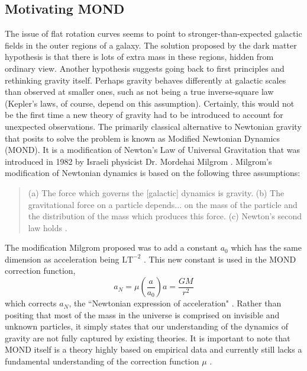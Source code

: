 \documentclass[11pt, twocolumn]{article}
\newcommand{\ff}[2]{\frac{#1}{#2}}
\begin{document}
    \subsection*{Motivating MOND}
    The issue of flat rotation curves seems to point to stronger-than-expected galactic fields in the outer regions of a galaxy. The solution proposed by the dark matter hypothesis is that there is lots of extra mass in these regions, hidden from ordinary view. Another hypothesis suggests going back to first principles and rethinking gravity itself. Perhaps gravity behaves differently at galactic scales than observed at smaller ones, such as not being a true inverse-square law (Kepler's laws, of course, depend on this assumption). Certainly, this would not be the first time a new theory of gravity had to be introduced to account for unexpected observations. The primarily classical alternative to Newtonian gravity that posits to solve the problem is known as Modified Newtonian Dynamics (MOND). It is a modification of Newton's Law of Universal Gravitation that was introduced in 1982 by Israeli physicist Dr. Mordehai Milgrom \parencite*{milgrom_modification_1983}.
    Milgrom's modification of Newtonian dynamics is based on the following three assumptions:
    \begin{quote}
        (a) The force which governs the [galactic] dynamics is gravity. (b) The gravitational force on a particle depends... on the mass of the particle and the distribution of the mass which produces this force. (c) Newton's second law holds \parencite*{milgrom_modification_1983}.
    \end{quote}
    The modification Milgrom proposed was to add a constant \(a_0\) which has the same dimension as acceleration being \(\mbox{LT}^{-2}\) \parencite*{milgrom_mond--pedagogical_2001}.
    This new constant is used in the MOND correction function,
    \begin{equation}
        a_N = \mu \left(\ff{a}{a_0}\right) a = \ff{GM}{r^2}
    \end{equation}
    which corrects \(a_N\), the ``Newtonian expression of acceleration" \parencite{milgrom_mond--pedagogical_2001}.
    Rather than positing that most of the mass in the universe is comprised on invisible and unknown particles, it simply states that our understanding of the dynamics of gravity are not fully captured by existing theories. It is important to note that MOND itself is a theory highly based on empirical data and currently still lacks a fundamental understanding of the correction function \(\mu\) \parencite{milgrom_mond--pedagogical_2001}.
\end{document}
